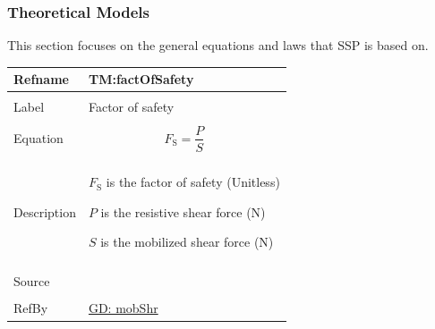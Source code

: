 \documentclass[12pt]{article}
\begin{document}
\subsubsection{Theoretical Models}
\label{Sec:TMs}
This section focuses on the general equations and laws that SSP is based on.

\vspace{\baselineskip}
\noindent
\begin{minipage}{\textwidth}
\begin{tabular}{>{\raggedright}p{}>{\raggedright\arraybackslash}p{}}
\toprule \textbf{Refname} & \textbf{TM:factOfSafety}
\label{TM:factOfSafety}
\\ \midrule \\
Label & Factor of safety
        
\\ \midrule \\
Equation & \begin{displaymath}
           {F_{\text{S}}}=\frac{P}{S}
           \end{displaymath}
\\ \midrule \\
Description & \begin{symbDescription}
              \item{${F_{\text{S}}}$ is the factor of safety (Unitless)}
              \item{$P$ is the resistive shear force (N)}
              \item{$S$ is the mobilized shear force (N)}
              \end{symbDescription}
\\ \midrule \\
Source & \cite{fredlund1977}
         
\\ \midrule \\
RefBy & \hyperref[GD:mobShr]{GD: mobShr}
        
\\ \bottomrule
\end{tabular}
\end{minipage}
\vspace{\baselineskip}
\noindent
\end{document}
